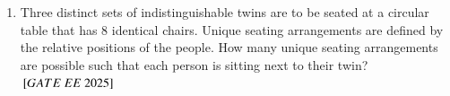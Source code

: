 \documentclass[journal,12pt,onecolumn]{IEEEtran}
\theoremstyle{remark}
\begin{document}
\begin{enumerate}
\begin{enumerate}
  \end{enumerate}
  \item Three distinct sets of indistinguishable twins are to be seated at a circular table that has 8 identical chairs. Unique seating arrangements are defined by the relative positions of the people.
How many unique seating arrangements are possible such that each person is sitting next to their twin?
\hfill $\sbrak{GATE\ EE\ 2025}$
   \begin{enumerate}
    \end{enumerate}


\end{enumerate}
\end{document}
